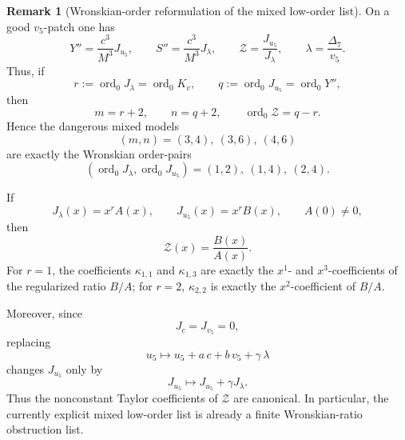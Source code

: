 \documentclass[11pt,a4paper]{amsart}
\theoremstyle{plain}
\theoremstyle{definition}
\newtheorem{remark}[theorem]{Remark}
\begin{document}
\begin{remark}[Wronskian-order reformulation of the mixed low-order list]
\label{rem:wronskian-order-reformulation-mixed-list}
On a good $v_5$-patch one has
\[
Y''=\frac{c^3}{M^3}J_{u_5},
\qquad
S''=\frac{c^3}{M^3}J_\lambda,
\qquad
\mathcal Z=\frac{J_{u_5}}{J_\lambda},
\qquad
\lambda=\frac{\Delta_7}{v_5}.
\]
Thus, if
\[
r:=\operatorname{ord}_0 J_\lambda=\operatorname{ord}_0 K_v,
\qquad
q:=\operatorname{ord}_0 J_{u_5}=\operatorname{ord}_0 Y'',
\]
then
\[
m=r+2,
\qquad
n=q+2,
\qquad
\operatorname{ord}_0\mathcal Z=q-r.
\]
Hence the dangerous mixed models
\[
(m,n)=(3,4),\ (3,6),\ (4,6)
\]
are exactly the Wronskian order-pairs
\[
(\operatorname{ord}_0J_\lambda,\operatorname{ord}_0J_{u_5})=(1,2),\ (1,4),\ (2,4).
\]

If
\[
J_\lambda(x)=x^rA(x),
\qquad
J_{u_5}(x)=x^rB(x),
\qquad
A(0)\neq 0,
\]
then
\[
\mathcal Z(x)=\frac{B(x)}{A(x)}.
\]
For $r=1$, the coefficients $\kappa_{1,1}$ and $\kappa_{1,3}$ are exactly the
$x^1$- and $x^3$-coefficients of the regularized ratio $B/A$; for $r=2$,
$\kappa_{2,2}$ is exactly the $x^2$-coefficient of $B/A$.

Moreover, since
\[
J_c=J_{v_5}=0,
\]
replacing
\[
u_5\longmapsto u_5+a\,c+b\,v_5+\gamma\,\lambda
\]
changes $J_{u_5}$ only by
\[
J_{u_5}\longmapsto J_{u_5}+\gamma J_\lambda.
\]
Thus the nonconstant Taylor coefficients of $\mathcal Z$ are canonical. In
particular, the currently explicit mixed low-order list is already a finite
Wronskian-ratio obstruction list.
\end{remark}
\end{document}
